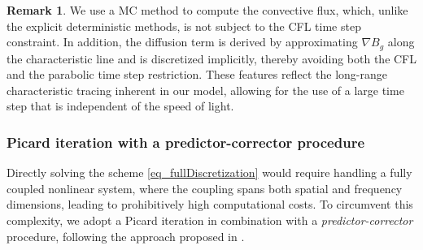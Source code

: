\documentclass[preprint,12pt]{elsarticle}
\theoremstyle{definition}
\newtheorem{remark}{Remark}[section]
\theoremstyle{plain}
\numberwithin{equation}{section}
\numberwithin{algorithm}{section}
\newcounter{eq_count}
\begin{document}
    \begin{remark}
     We use a MC method to compute the convective flux, which, unlike the explicit deterministic methods, is not subject to the CFL time step constraint.  In addition, the diffusion term is derived by approximating $\nabla B_g$ along the characteristic line and is discretized implicitly, thereby avoiding both the CFL and the parabolic time step restriction.  These features reflect the long-range characteristic tracing inherent in our model,  allowing for the use of a large time step that is independent of the speed of light.
    \end{remark}
 \subsubsection{Picard iteration with a predictor-corrector procedure}
     Directly solving the scheme \eqref{eq_fullDiscretization} would require handling a fully coupled nonlinear system, where the coupling spans both spatial and frequency dimensions, leading to prohibitively high computational costs.  To circumvent this complexity, we adopt a Picard iteration in combination with a \textit{predictor-corrector} procedure, following the approach proposed in \cite{xiong2022high,tang2021accurate}. 
     
\end{document}
